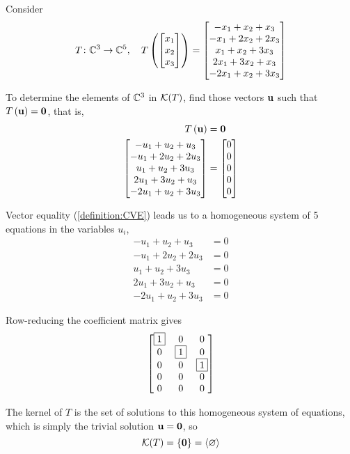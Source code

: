 \documentclass{ximera}
\begin{document}
\begin{example}

Consider
\[
T\colon \mathbb{C}^{3}\rightarrow\mathbb{C}^{5},\quad
T\left(\begin{bmatrix}x_1\\x_2\\x_3\end{bmatrix}\right)=
\begin{bmatrix}-x_1 + x_2 + x_3\\
-x_1 + 2 x_2 + 2 x_3\\
x_1 + x_2 + 3 x_3\\
2 x_1 + 3 x_2 + x_3\\
-2 x_1 + x_2 + 3 x_3\end{bmatrix}
\]


To determine the elements of $\mathbb{C}^{3}$ in $\mathcal{K}\!\left(T\right)$, find those vectors $\mathbf{u}$ such that $T\left(\mathbf{u}\right)=\mathbf{0}$, that is,
\begin{align*}
T\left(\mathbf{u}\right)&=\mathbf{0}\\
\begin{bmatrix}
-u_1 + u_2 + u_3\\
-u_1 + 2 u_2 + 2 u_3\\
u_1 + u_2 + 3 u_3\\
2 u_1 + 3 u_2 + u_3\\
-2 u_1 + u_2 + 3 u_3
\end{bmatrix}
&=
\begin{bmatrix}0\\0\\0\\0\\0\end{bmatrix}
\end{align*}




Vector equality (\ref{definition:CVE}) leads us to a homogeneous system of 5 equations in the variables $u_i$,
\begin{align*}
-u_1 + u_2 + u_3&=0\\
-u_1 + 2 u_2 + 2 u_3&=0\\
u_1 + u_2 + 3 u_3&=0\\
2 u_1 + 3 u_2 + u_3&=0\\
-2 u_1 + u_2 + 3 u_3&=0
\end{align*}




Row-reducing the coefficient matrix gives
\[
\begin{bmatrix}
\fbox{1} & 0 & 0\\
0 & \fbox{1} & 0\\
0 & 0 & \fbox{1}\\
0 & 0 & 0\\
0 & 0 & 0
\end{bmatrix}
\]


The kernel of $T$ is the set of solutions to this homogeneous system of equations, which is simply the trivial solution $\mathbf{u}=\mathbf{0}$, so
\[
\mathcal{K}\!\left(T\right)=\left\{\mathbf{0}\right\}=\left\langle\varnothing\right\rangle
\]

\end{example}
\end{document}
